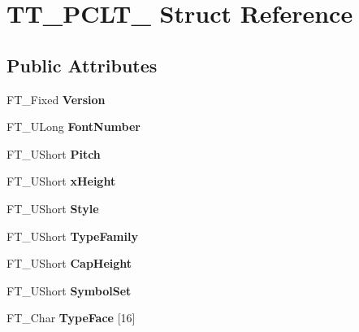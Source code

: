 \hypertarget{structTT__PCLT__}{}\section{T\+T\+\_\+\+P\+C\+L\+T\+\_\+ Struct Reference}
\label{structTT__PCLT__}
\subsection*{Public Attributes}
\begin{DoxyCompactItemize}
\item 
\mbox{\label{structTT__PCLT___a83429ca782a731b38d67e604809e278c}} 
F\+T\+\_\+\+Fixed {\bfseries Version}
\item 
\mbox{\label{structTT__PCLT___a1465aa1ea82df2be913eb64498fe3d94}} 
F\+T\+\_\+\+U\+Long {\bfseries Font\+Number}
\item 
\mbox{\label{structTT__PCLT___ae8134f929d7a259c081fe28e9b5cf53d}} 
F\+T\+\_\+\+U\+Short {\bfseries Pitch}
\item 
\mbox{\label{structTT__PCLT___a4b2f3e6bf6508eacbff5e4eb16745872}} 
F\+T\+\_\+\+U\+Short {\bfseries x\+Height}
\item 
\mbox{\label{structTT__PCLT___a8e99588c1d255e28aa3c59600d5ae7bd}} 
F\+T\+\_\+\+U\+Short {\bfseries Style}
\item 
\mbox{\label{structTT__PCLT___a9bb9ac1b782e03002ecb99de08af7935}} 
F\+T\+\_\+\+U\+Short {\bfseries Type\+Family}
\item 
\mbox{\label{structTT__PCLT___a754d840e5bcf6011459de635aa38d728}} 
F\+T\+\_\+\+U\+Short {\bfseries Cap\+Height}
\item 
\mbox{\label{structTT__PCLT___ad4eeb575ecd624d4540275981e96a336}} 
F\+T\+\_\+\+U\+Short {\bfseries Symbol\+Set}
\item 
\mbox{\label{structTT__PCLT___a6a7fad37a398b480c9932c1c164f8ec0}} 
F\+T\+\_\+\+Char {\bfseries Type\+Face} \mbox{[}16\mbox{]}

\end{DoxyCompactItemize}
